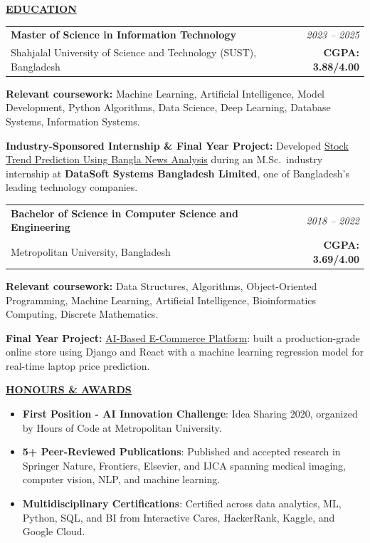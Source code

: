 \documentclass[10pt,letterpaper]{article}
\newcommand{\sectiontitle}[1]{\vspace{3pt}\noindent\underline{\textbf{#1}}\vspace{2pt}\par}
\begin{document}
\sectiontitle{EDUCATION}

\noindent
\begin{tabularx}{\linewidth}{@{}X r@{}}
  \textbf{Master of Science in Information Technology} & \textit{2023 -- 2025} \\
  Shahjalal University of Science and Technology (SUST), Bangladesh & \textbf{CGPA: 3.88/4.00}
\end{tabularx}

\vspace{3pt}
\textbf{Relevant coursework:} Machine Learning, Artificial Intelligence, Model Development, Python Algorithms, Data Science, Deep Learning, Database Systems, Information Systems.

\vspace{3pt}
\textbf{Industry-Sponsored Internship \& Final Year Project:} Developed \href{https://github.com/nakib33/Stock-trend-prediction-using-news-analysis}{Stock Trend Prediction Using Bangla News Analysis} during an M.Sc.\ industry internship at \textbf{DataSoft Systems Bangladesh Limited}, one of Bangladesh's leading technology companies.

\vspace{4pt}

\noindent
\begin{tabularx}{\linewidth}{@{}X r@{}}
  \textbf{Bachelor of Science in Computer Science and Engineering} & \textit{2018 -- 2022} \\
  Metropolitan University, Bangladesh & \textbf{CGPA: 3.69/4.00}
\end{tabularx}

\vspace{3pt}
\textbf{Relevant coursework:} Data Structures, Algorithms, Object-Oriented Programming, Machine Learning, Artificial Intelligence, Bioinformatics Computing, Discrete Mathematics.

\vspace{3pt}
\textbf{Final Year Project:} \href{https://github.com/nakib33/Laptop-Store-AI_Based_Ecommerce-Website-FInal-Year-Project-}{AI-Based E-Commerce Platform}: built a production-grade online store using Django and React with a machine learning regression model for real-time laptop price prediction.

\sectiontitle{HONOURS \& AWARDS}
\begin{itemize}
  \item \textbf{First Position - AI Innovation Challenge}: Idea Sharing 2020, organized by Hours of Code at Metropolitan University.
  \item \textbf{5+ Peer-Reviewed Publications}: Published and accepted research in Springer Nature, Frontiers, Elsevier, and IJCA spanning medical imaging, computer vision, NLP, and machine learning.
  \item \textbf{Multidisciplinary Certifications}: Certified across data analytics, ML, Python, SQL, and BI from Interactive Cares, HackerRank, Kaggle, and Google Cloud.
\end{itemize}
\end{document}
